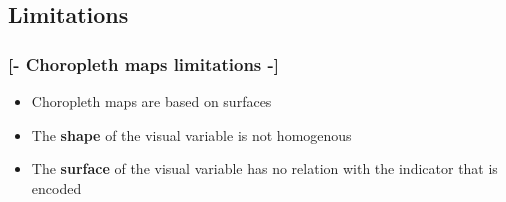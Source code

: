 \documentclass[xcolor=x11names,aspectratio=169, compress]{beamer}
\renewcommand{\(}{\begin{columns}}
\renewcommand{\)}{\end{columns}}
\newcommand{\<}[1]{\begin{column}{#1}}
\renewcommand{\>}{\end{column}}
\begin{document}
\subsection{Limitations}



\begin{frame} %
\frametitle{\textcolor{brique}{[-  \textbf{Choropleth maps limitations} -]}}
\begin{itemize}[<+-|alert@+>]
    \item Choropleth maps are based on surfaces
    \item The \textbf{shape} of the visual variable is not homogenous
    \item The \textbf{surface} of the visual variable has no relation with the indicator that is encoded
\end{itemize}
\end{frame}
\end{document}
